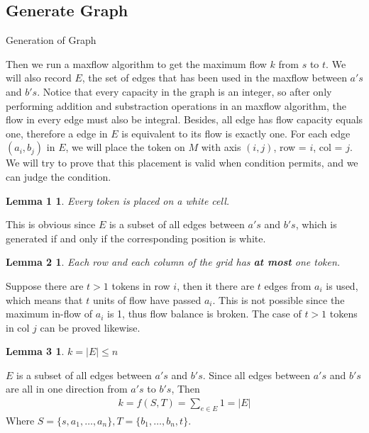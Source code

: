 \documentclass{report}
\begin{document}
    \subsection*{Generate Graph}
    \begin{algorithm}
        \caption{Generation of Graph}
        \begin{algorithmic}[1]
            \EndFor{}
                    \EndIf{}
                \EndFor{}
            \EndFor{}
        \end{algorithmic}
    \end{algorithm}
    Then we run a maxflow algorithm to get the maximum flow $k$ from $s$ to $t$. 
    We will also record $E$, the set of edges that has been used in the maxflow between 
    $a's$ and $b's$. Notice that every capacity in the graph is an integer, so after only 
    performing addition and substraction operations in an maxflow algorithm, the flow in every
    edge must also be integral. Besides, all edge has flow capacity equals one, 
    therefore a edge in $E$ is equivalent to its flow is exactly one. 
    For each edge $(a_i, b_j)$ in $E$, we will place the token on $M$ 
    with axis $(i, j)$, row = $i$, col = $j$. We will try to prove that this placement is 
    valid when condition permits, and we can judge the condition.
    \newtheorem*{l1}{Lemma 1}
    \begin{l1}
        Every token is placed on a white cell.
    \end{l1}
    This is obvious since $E$ is a subset of all edges between $a's$ and $b's$, which 
    is generated if and only if the corresponding position is white.
    \newtheorem*{l2}{Lemma 2}
    \begin{l2}
        Each row and each column of the grid has \textbf{at most} one token.
    \end{l2}
    Suppose there are $t>1$ tokens in row $i$, then it there are $t$ edges from
    $a_i$ is used, which means that $t$ units of flow have passed $a_i$. This is not 
    possible since the maximum in-flow of $a_i$ is 1, thus flow balance is broken.
    The case of $t>1$ tokens in col $j$ can be proved likewise. 
    \newtheorem*{l3}{Lemma 3}
    \begin{l3}
        $k = |E| \le n$
    \end{l3}
    $E$ is a subset of all edges between $a's$ and $b's$. Since all edges between $a's$ 
    and $b's$ are all in one direction from $a's$ to $b's$, Then 
    \begin{align*}
        k = f(S, T) = \sum_{e \in E} 1 = |E|
    \end{align*}
    Where $S = \{s, a_1, \ldots, a_n\}, T = \{b_1, \ldots, b_n, t\}$.
\end{document}

